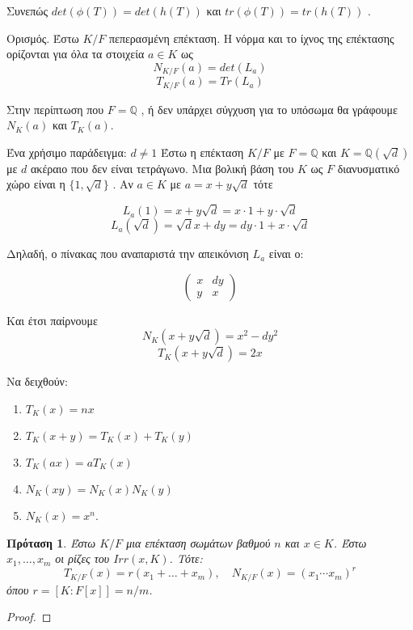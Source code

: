\documentclass[oneside,a4paper]{article}
\newtheorem{prop}{Πρόταση}
\begin{document}
Συνεπώς $det(\phi(T)) = det(h(T))$ και $tr(\phi(T)) = tr(h(T))$ .

Ορισμός. Έστω $K/F$ πεπερασμένη επέκταση. Η νόρμα και το ίχνος της επέκτασης ορίζονται για όλα τα στοιχεία $a \in K$ ως
$$N_{K/F} (a) = det(L_a)$$
$$T_{K/F} (a) = Tr(L_a)$$

Στην περίπτωση που $F=\mathbb{Q}$ , ή δεν υπάρχει σύγχυση για το υπόσωμα θα γράφουμε $N_K(a)$ και $T_K (a)$.

Ένα χρήσιμο παράδειγμα:
$d\neq 1$
Έστω η επέκταση $K/F$ με $F=\mathbb{Q}$ και $K = \mathbb{Q} (\sqrt{d})$ με $d$ ακέραιο που δεν είναι τετράγωνο. Μια βολική βάση του $K$ ως $F$ διανυσματικό χώρο είναι η $\{1,\sqrt{d}\}$ . Αν $a \in K$ με $a = x + y\sqrt{d}$ τότε 

$$L_a (1) = x + y\sqrt{d} = x\cdot 1 + y \cdot \sqrt{d}$$
$$L_a (\sqrt{d}) = \sqrt{d}x + dy = dy\cdot 1 + x \cdot \sqrt{d}$$

Δηλαδή, ο πίνακας που αναπαριστά την απεικόνιση $L_a$ είναι ο:

$$\begin{pmatrix}x & dy \\ y & x\end{pmatrix}$$

Και έτσι παίρνουμε 
$$N_K(x+y\sqrt{d}) = x^2 - dy^2$$
$$T_K(x+y\sqrt{d}) = 2x$$




Να δειχθούν:

\begin{enumerate}
	\item $T_K(x) = nx$
	\item $T_K(x+y) = T_K(x) + T_K(y)$
	\item $T_K(ax) = aT_K(x)$
	\item $N_K(xy) = N_K(x) N_K(y)$
	\item $N_K(x) = x^n$. 
\end{enumerate}


\begin{prop} Έστω $K/F$ μια επέκταση σωμάτων βαθμού $n$ και $x \in K$. Έστω $x_1,\ldots,x_m$ οι ρίζες του $Irr(x,K)$. Τότε:
	$$T_{K/F}(x) = r(x_1 + \ldots + x_m), \quad N_{K/F}(x) = (x_1 \cdots x_m)^r$$ όπου $r = [K:F[x]] = n/m$.

\end{prop}

\begin{proof}
\end{proof}
\end{document}
